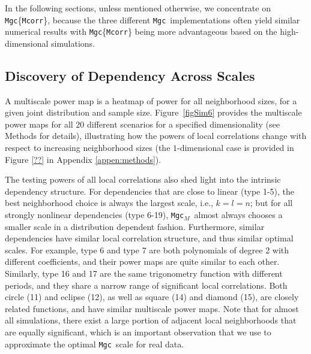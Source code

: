 \documentclass[11pt]{article}
\newcommand{\note}[2][]{\added[#1,remark={#2}]{}}
\providecommand{\sct}[1]{{\sc \texttt{#1}}}
\newcommand{\Mgc}{\sct{Mgc}}
\newcommand{\Mgcm}{\sct{Mgc$_M$}}
\newcommand{\Mcorr}{\sct{Mcorr}}
\newcommand{\jv}[1]{{\note{jv: #1}}}
\begin{document}
In the following sections, unless mentioned otherwise, we concentrate on \Mgc\{\Mcorr\}, because the three different \Mgc~implementations often yield similar numerical results with \Mgc\{\Mcorr\} being more advantageous based on the high-dimensional simulations.

\subsection{Discovery of Dependency Across Scales}
\label{main3}

A multiscale power map is a heatmap of power for all neighborhood sizes, for a given joint distribution and sample size.
Figure~\ref{figSim6} provides the multiscale power maps for all 20 different scenarios for a specified dimensionality (see Methods for details), illustrating how the powers of local correlations change with respect to increasing neighborhood sizes
(the $1$-dimensional case is provided in Figure \ref{??} in Appendix \ref{appen:methods}\jv{cs: i can't keep track of your references, please put in the right one here. i typically make a scheme, 'f:' for figure, 's:' for section, 'a:' for algorithm, and then follow it with something informative, ie, not a number.}). 

The testing powers of all local correlations also shed light into the intrinsic dependency structure. 
For dependencies that are close to linear (type 1-5), the best neighborhood choice is always the largest scale, i.e., $k=l=n$; but for all strongly nonlinear dependencies (type 6-19), \Mgcm~almost always chooses a smaller scale in a distribution dependent fashion. Furthermore, similar dependencies have similar local correlation structure, and thus similar optimal scales. For example, type 6 and type 7 are both polynomials of degree 2 with different coefficients, and their power maps are quite similar to each other. Similarly, type 16 and 17 are the same trigonometry function with different periods, and they share a narrow range of significant local correlations.
Both circle (11) and eclipse (12), as well as square (14) and diamond (15), are closely related functions, and have similar multiscale power maps. 
Note that for almost all simulations, there exist a large portion of adjacent local neighborhoods that are equally significant, which is an important observation that we use to approximate the optimal \Mgc~scale for real data.
\end{document}
